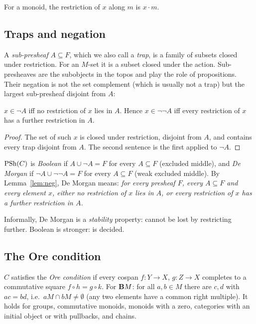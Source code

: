 For a monoid, the restriction of $x$ along $m$ is $x\cdot m$.

\subsection{Traps and negation}

A \emph{sub-presheaf} $A\subseteq F$, which we also call a \emph{trap}, is a family of subsets closed under restriction. For an $M$-set it is a subset closed under the action. Sub-presheaves are the subobjects in the topos and play the role of propositions. Their negation is not the set complement (which is usually not a trap) but the largest sub-presheaf disjoint from $A$:

\begin{lemma}\label{lem:neg}
$x\in\neg A$ iff no restriction of $x$ lies in $A$. Hence $x\in\neg\neg A$ iff every restriction of $x$ has a further restriction in $A$.
\end{lemma}

\begin{proof}
The set of such $x$ is closed under restriction, disjoint from $A$, and contains every trap disjoint from $A$. The second sentence is the first applied to $\neg A$.
\end{proof}

\begin{definition}
$\mathrm{PSh}(C)$ is \emph{Boolean} if $A\cup\neg A = F$ for every $A\subseteq F$ (excluded middle), and \emph{De Morgan} if $\neg A\cup\neg\neg A = F$ for every $A\subseteq F$ (weak excluded middle). By Lemma~\ref{lem:neg}, De Morgan means: \emph{for every presheaf $F$, every $A\subseteq F$ and every element $x$, either no restriction of $x$ lies in $A$, or every restriction of $x$ has a further restriction in $A$.}
\end{definition}

Informally, De Morgan is a \emph{stability} property:  cannot be lost by restricting further. Boolean is stronger:  is decided.

\subsection{The Ore condition}

$C$ satisfies the \emph{Ore condition} if every cospan $f : Y\to X$, $g : Z\to X$ completes to a commutative square $f\circ h = g\circ k$. For $\mathbf{B} M$: for all $a,b\in M$ there are $c,d$ with $ac = bd$, i.e.\ $aM\cap bM\neq\emptyset$ (any two elements have a common right multiple). It holds for groups, commutative monoids, monoids with a zero, categories with an initial object or with pullbacks, and chains.


